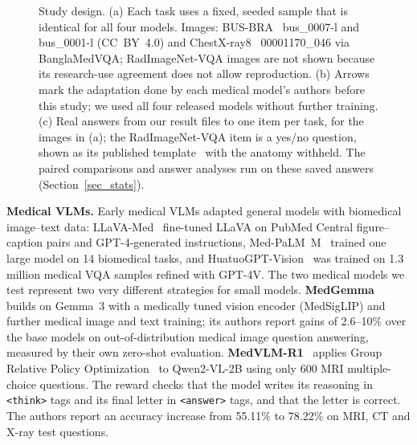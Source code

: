 \documentclass[doublecolumn]{ijcvsplatex}
\newcommand{\qwen}{Qwen2-VL}
\newcommand{\medvlm}{MedVLM-R1}
\newcommand{\gemma}{Gemma~3}
\newcommand{\medgemma}{MedGemma}
\begin{document}
\begin{figure}[tb]
\centering

\caption{Study design. (a) Each task uses a fixed, seeded sample that is identical for all four models. Images: BUS-BRA~\cite{gomezflores2024busbra} bus\_0007-l and bus\_0001-l (CC~BY~4.0) and ChestX-ray8~\cite{wang2017chestxray8} 00001170\_046 via BanglaMedVQA; RadImageNet-VQA images are not shown because its research-use agreement does not allow reproduction. (b) Arrows mark the adaptation done by each medical model's authors before this study; we used all four released models without further training. (c) Real answers from our result files to one item per task, for the images in (a); the RadImageNet-VQA item is a yes/no question, shown as its published template~\cite{butsanets2025radimagenetvqa} with the anatomy withheld. The paired comparisons and answer analyses run on these saved answers (Section~\ref{sec_stats}).}
\label{fig_pipeline}
\end{figure}

\textbf{Medical VLMs.} Early medical VLMs adapted general models with biomedical image--text data: LLaVA-Med~\cite{li2023llavamed} fine-tuned LLaVA on PubMed Central figure--caption pairs and GPT-4-generated instructions, Med-PaLM~M~\cite{tu2023medpalmm} trained one large model on 14 biomedical tasks, and HuatuoGPT-Vision~\cite{chen2024huatuogptvision} was trained on 1.3 million medical VQA samples refined with GPT-4V. The two medical models we test represent two very different strategies for small models. \textbf{\medgemma{}}~\cite{sellergren2025medgemma} builds on \gemma{} with a medically tuned vision encoder (MedSigLIP) and further medical image and text training; its authors report gains of 2.6--10\% over the base models on out-of-distribution medical image question answering, measured by their own zero-shot evaluation. \textbf{\medvlm{}}~\cite{pan2025medvlmr1} applies Group Relative Policy Optimization~\cite{shao2024deepseekmath} to \qwen{}-2B using only 600 MRI multiple-choice questions. The reward checks that the model writes its reasoning in \texttt{<think>} tags and its final letter in \texttt{<answer>} tags, and that the letter is correct. The authors report an accuracy increase from 55.11\% to 78.22\% on MRI, CT and X-ray test questions.
\end{document}
